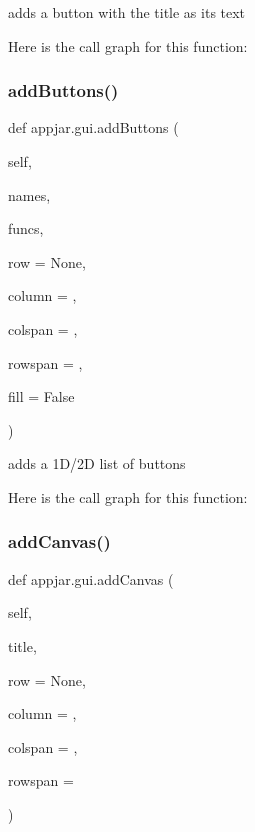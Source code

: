 \begin{DoxyVerb}adds a button with the title as its text \end{DoxyVerb}
 Here is the call graph for this function\+:
\mbox{\label{classappjar_1_1gui_afc0cb1277159e171b5640069a801a4e6}} 
\subsubsection{\texorpdfstring{add\+Buttons()}{addButtons()}}
{\footnotesize\ttfamily def appjar.\+gui.\+add\+Buttons (\begin{DoxyParamCaption}\item[{}]{self,  }\item[{}]{names,  }\item[{}]{funcs,  }\item[{}]{row = {\ttfamily None},  }\item[{}]{column = {},  }\item[{}]{colspan = {},  }\item[{}]{rowspan = {},  }\item[{}]{fill = {\ttfamily False} }\end{DoxyParamCaption})}

\begin{DoxyVerb}adds a 1D/2D list of buttons \end{DoxyVerb}
 Here is the call graph for this function\+:
\mbox{\label{classappjar_1_1gui_a9a246e214fb1afe00e39db46b935fd9e}} 
\subsubsection{\texorpdfstring{add\+Canvas()}{addCanvas()}}
{\footnotesize\ttfamily def appjar.\+gui.\+add\+Canvas (\begin{DoxyParamCaption}\item[{}]{self,  }\item[{}]{title,  }\item[{}]{row = {\ttfamily None},  }\item[{}]{column = {},  }\item[{}]{colspan = {},  }\item[{}]{rowspan = {} }\end{DoxyParamCaption})}



